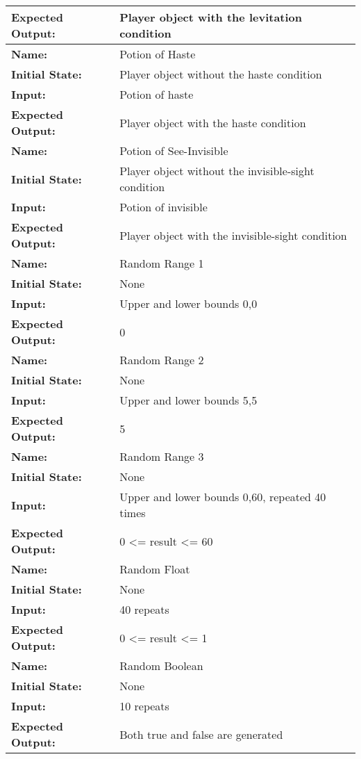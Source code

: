 \documentclass[12pt, titlepage]{article}
\begin{document}
\begin{center}
\begin{longtable}{ l | p{10cm} }
				\textbf{Expected Output:} & Player object with the levitation condition\\
				\hline
				\textbf{Name:} & Potion of Haste\\
				\textbf{Initial State:} & Player object without the haste condition\\
				\textbf{Input:} & Potion of haste\\
				\textbf{Expected Output:} & Player object with the haste condition\\
				\hline
				\textbf{Name:} & Potion of See-Invisible\\
				\textbf{Initial State:} & Player object without the invisible-sight condition\\
				\textbf{Input:} & Potion of invisible\\
				\textbf{Expected Output:} & Player object with the invisible-sight condition\\
				\hline
				\textbf{Name:} & Random Range 1\\
				\textbf{Initial State:} & None\\
				\textbf{Input:} & Upper and lower bounds 0,0\\
				\textbf{Expected Output:} & 0\\
				\hline
				\textbf{Name:} & Random Range 2\\
				\textbf{Initial State:} & None\\
				\textbf{Input:} & Upper and lower bounds 5,5\\
				\textbf{Expected Output:} & 5\\
				\hline
				\textbf{Name:} & Random Range 3\\
				\textbf{Initial State:} & None\\
				\textbf{Input:} & Upper and lower bounds 0,60, repeated 40 times\\
				\textbf{Expected Output:} & 0 <= result <= 60\\
				\hline
				\textbf{Name:} & Random Float\\
				\textbf{Initial State:} & None\\
				\textbf{Input:} & 40 repeats\\
				\textbf{Expected Output:} & 0 <= result <= 1\\
				\hline
				\textbf{Name:} & Random Boolean\\
				\textbf{Initial State:} & None\\
				\textbf{Input:} & 10 repeats\\
				\textbf{Expected Output:} & Both true and false are generated\\

\end{longtable}
\end{center}
\end{document}
